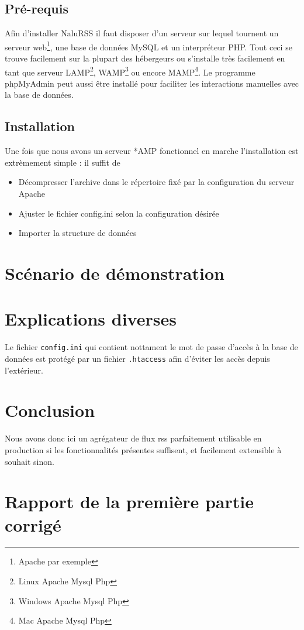\documentclass[11pt]{article}
\begin{document}
\subsection{Pré-requis}
Afin d'installer NaluRSS il faut disposer d'un serveur sur lequel tournent un serveur web\footnote{Apache par exemple}, une base de données MySQL et un interpréteur PHP. Tout ceci se trouve facilement sur la plupart des hébergeurs ou s'installe très facilement en tant que serveur LAMP\footnote{Linux Apache Mysql Php}, WAMP\footnote{Windows Apache Mysql Php} ou encore MAMP\footnote{Mac Apache Mysql Php}. Le programme phpMyAdmin peut aussi être installé pour faciliter les interactions manuelles avec la base de données.
\subsection{Installation}
Une fois que nous avons un serveur *AMP fonctionnel en marche l'installation est extrèmement simple : il suffit de 
\begin{itemize}
\item{Décompresser l'archive dans le répertoire fixé par la configuration du serveur Apache}
\item{Ajuster le fichier config.ini selon la configuration désirée}
\item{Importer la structure de données}
\end{itemize}

\section{Scénario de démonstration}

\section{Explications diverses}
Le fichier \verb|config.ini| qui contient nottament le mot de passe d'accès à la base de données est protégé par un fichier \verb|.htaccess| afin d'éviter les accès depuis l'extérieur.

\section{Conclusion}
Nous avons donc ici un agrégateur de flux rss parfaitement utilisable en production si les fonctionnalités présentes suffisent, et facilement extensible à souhait sinon.

\section{Rapport de la première partie corrigé}
\end{document}
